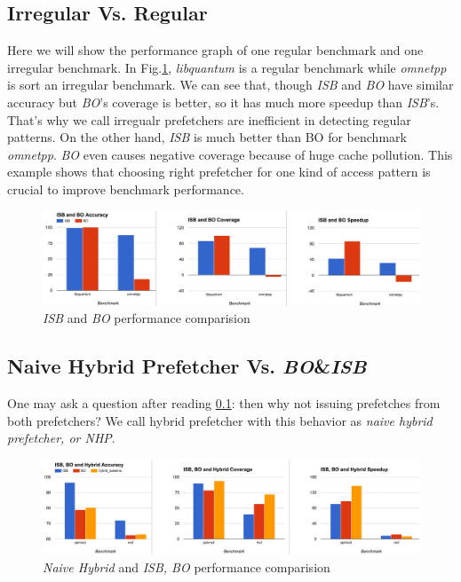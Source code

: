   \subsection{Irregular Vs. Regular}
  \label{sec:irrVsre}
  Here we will show the performance graph of one regular benchmark and one irregular benchmark. In Fig.\ref{fig:regVsirreg}, \emph{libquantum} is a regular benchmark while \emph{omnetpp} is sort an irregular benchmark. We can see that, though \emph{ISB} and \emph{BO} have similar accuracy but \emph{BO}'s coverage is better, so it has much more speedup than \emph{ISB}'s. That's why we call irregualr prefetchers are inefficient in detecting regular patterns. On the other hand, \emph{ISB} is much better than BO for benchmark \emph{omnetpp}. \emph{BO} even causes negative coverage because of huge cache pollution. This example shows that choosing right prefetcher for one kind of access pattern is crucial to improve benchmark performance.
  \begin{figure}[ht!]
	  \centering
	  \includegraphics[width=1.0\textwidth]{images/isbvsbo.png}
	  \caption{\emph{ISB} and \emph{BO} performance comparision}
	  \label{fig:regVsirreg}
  \end{figure}


  \subsection{Naive Hybrid Prefetcher Vs. \emph{BO}\&\emph{ISB}}
  \label{sec:naivehy}
  One may ask a question after reading \ref{sec:irrVsre}: then why not issuing prefetches from both prefetchers? We call hybrid prefetcher with this behavior as \emph{naive hybrid prefetcher, or NHP}.
  \begin{figure}[ht!]
	  \centering
	  \includegraphics[width=1.0\textwidth]{images/hybridVssingle.png}
	  \caption{\emph{Naive Hybrid} and \emph{ISB, BO} performance comparision}
	  \label{fig:hybridVssingle}
  \end{figure}

